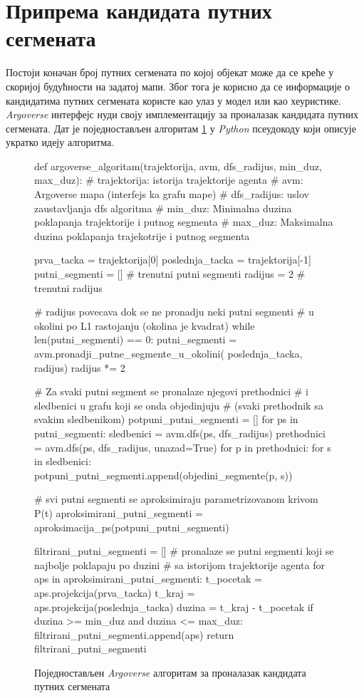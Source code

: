 \documentclass[11pt,oneside]{memoir}
\begin{document}
\section{Припрема кандидата путних сегмената}

Постоји коначан број путних сегмената по којој
објекат може да се креће у скоријој будућности на задатој мапи. Због тога је корисно да се информације о кандидатима путних сегмената
користе као улаз у модел или као хеуристике.
\textit{Argoverse} интерфејс нуди своју имплементацију
за проналазак кандидата путних сегмената. Дат је поједностављен алгоритам \ref{argoverse-clcand} у \textit{Python} 
псеудокоду који описује укратко идеју алгоритма.

\begin{figure}
\begin{python}
def argoverse_algoritam(trajektorija, avm, dfs_radijus, min_duz, max_duz):
  # trajektorija: istorija trajektorije agenta 
  # avm: Argoverse mapa (interfejs ka grafu mape)
  # dfs_radijus: uslov zaustavljanja dfs algoritma
  # min_duz: Minimalna duzina poklapanja trajektorije i putnog segmenta
  # max_duz: Maksimalna duzina poklapanja trajekotrije i putnog segmenta

  prva_tacka = trajektorija[0]
  poslednja_tacka = trajektorija[-1]
  putni_segmenti = []  # trenutni putni segmenti
  radijus = 2  # trenutni radijus

  # radijus povecava dok se ne pronadju neki putni segmenti 
  # u okolini po L1 rastojanju (okolina je kvadrat)
  while len(putni_segmenti) == 0:
    putni_segmenti = avm.pronadji_putne_segmente_u_okolini(
      poslednja_tacka, radijus)
    radijus *= 2

  # Za svaki putni segment se pronalaze njegovi prethodnici
  # i sledbenici u grafu koji se onda objedinjuju 
  # (svaki prethodnik sa svakim sledbenikom)
  potpuni_putni_segmenti = []
  for ps in putni_segmenti:
    sledbenici = avm.dfs(ps, dfs_radijus)
    prethodnici = avm.dfs(ps, dfs_radijus, unazad=True)
    for p in prethodnici:
      for s in sledbenici:
        potpuni_putni_segmenti.append(objedini_segmente(p, s))

  # svi putni segmenti se aproksimiraju parametrizovanom krivom P(t)
  aproksimirani_putni_segmenti = aproksimacija_ps(potpuni_putni_segmenti)

  filtrirani_putni_segmenti = []
  # pronalaze se putni segmenti koji se najbolje poklapaju po duzini
  # sa istorijom trajektorije agenta
  for aps in aproksimirani_putni_segmenti:
    t_pocetak = aps.projekcija(prva_tacka)
    t_kraj = aps.projekcija(poslednja_tacka)
    duzina = t_kraj - t_pocetak
    if duzina >= min_duz and duzina <= max_duz:
      filtrirani_putni_segmenti.append(aps)
  return filtrirani_putni_segmenti
\end{python}
\caption{Поједностављен \textit{Argoverse} алгоритам за проналазак кандидата путних сегмената\label{argoverse-clcand}}
\end{figure}
\end{document}
